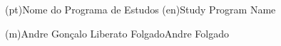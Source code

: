 \ntdegreename*(pt){Nome do Programa de Estudos}
\ntdegreename*(en){Study Program Name}




\ntauthorname(m){Andre Gonçalo Liberato Folgado}{Andre Folgado}

